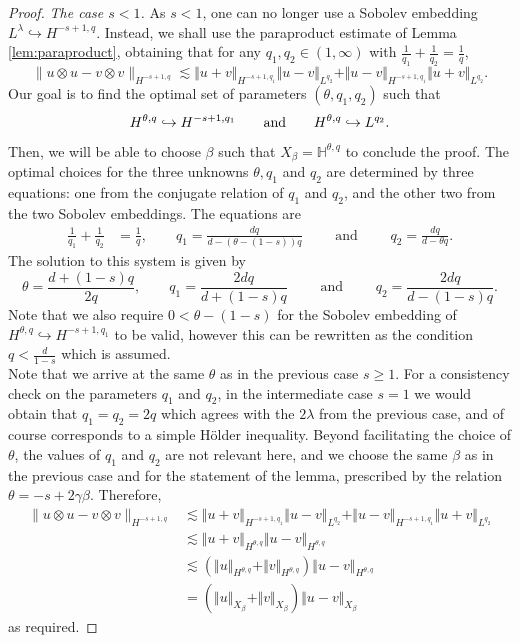\documentclass[11pt, a4paper,oneside, reqno]{amsart}
\theoremstyle{remark} %
\theoremstyle{definition} %
\numberwithin{theorem}{section}
\numberwithin{equation}{section}
\newcommand{\norm}[1]{\Vert #1 \Vert}
\newcommand{\gam}{\gamma}
\begin{document}
\begin{proof}
    \textit{The case $s< 1$.} As $s < 1$, one can no longer use a Sobolev embedding $L^\lambda \hookrightarrow H^{-s+1,q}$. Instead, we shall use the paraproduct estimate of Lemma \ref{lem:paraproduct}, obtaining that for any $q_1,q_2 \in (1,\infty)$ with $\frac{1}{q_1} + \frac{1}{q_2} = \frac{1}{q}$,
    $$\|u\otimes u - v\otimes v\|_{H^{-s+1,q}} \lesssim \norm{u+v}_{H^{-s+1,q_1}}\norm{u - v}_{L^{q_2}} + \norm{u-v}_{H^{-s+1,q_1}}\norm{u + v}_{L^{q_2}}.$$
    Our goal is to find the optimal set of parameters $(\theta, q_1, q_2)$ such that
    $$H^{\theta, q} \hookrightarrow H^{-s+1,q_1} \qquad \textnormal{and} \qquad H^{\theta, q} \hookrightarrow L^{q_2}.$$
    Then, we will be able to choose $\beta$ such that $X_{\beta} = \mathbb{H}^{\theta,q}$ to conclude the proof. The optimal choices for the three unknowns $\theta, q_1$ and $q_2$ are determined by three equations: one from the conjugate relation of $q_1$ and $q_2$, and the other two from the two Sobolev embeddings. The equations are
    \begin{align*}
        \frac{1}{q_1} + \frac{1}{q_2} &= \frac{1}{q},\qquad 
q_1 = \frac{dq}{d - \left(\theta - (1-s)\right)q}\qquad \text{ and }\qquad
q_2 = \frac{dq}{d - \theta q}.
    \end{align*}
    The solution to this system is given by
    $$\theta = \frac{d+(1-s)q}{2q}, \qquad q_1 = \frac{2dq}{d+(1-s)q} \qquad\text{ and }\qquad  q_2 = \frac{2dq}{d-(1-s)q}.$$
    Note that we also require $0 < \theta - (1-s)$ for the Sobolev embedding of $H^{\theta,q} \hookrightarrow H^{-s+1,q_1}$ to be valid, however this can be rewritten as the condition $q < \frac{d}{1-s}$ which is assumed.\\

    Note that we arrive at the same $\theta$ as in the previous case $s \geq 1$. For a consistency check on the parameters $q_1$ and $q_2$, in the intermediate case $s=1$ we would obtain that $q_1 = q_2 = 2q$ which agrees with the $2\lambda$ from the previous case, and of course corresponds to a simple H\"{o}lder inequality. Beyond facilitating the choice of $\theta$, the values of $q_1$ and $q_2$ are not relevant here, and we choose the same $\beta$ as in the previous case and for the statement of the lemma, prescribed by the relation $\theta=-s+2\gam\beta$. Therefore,
    \begin{align*}
        \|u\otimes u-v\otimes v\|_{H^{-s+1,q}} &\lesssim \norm{u+v}_{H^{-s+1,q_1}}\norm{u - v}_{L^{q_2}} + \norm{u-v}_{H^{-s+1,q_1}}\norm{u + v}_{L^{q_2}}\\
        &\lesssim \norm{u+v}_{H^{\theta,q}}\norm{u - v}_{H^{\theta,q}}\\
        &\lesssim \left(\norm{u}_{H^{\theta,q}} + \norm{v}_{H^{\theta,q}}\right)\norm{u - v}_{H^{\theta,q}}\\
        &= (\norm{u}_{X_{\beta}} + \norm{v}_{X_{\beta}})\norm{u - v}_{X_{\beta}}
    \end{align*}
    as required.
    


\end{proof}
\end{document}
